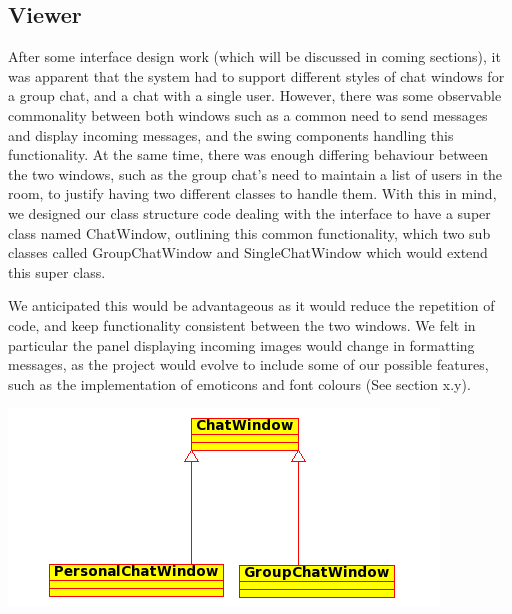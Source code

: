 \subsection {Viewer}

After some interface design work (which will be discussed in coming sections), it was apparent that the system had to support different styles of chat windows for a group chat, and a chat with a single user. However, there was some observable commonality between both windows such as a common need to send messages and display incoming messages, and the swing components handling this functionality. At the same time, there was enough differing behaviour between the two windows, such as the group chat’s need to maintain a list of users in the room, to justify having two different classes to handle them. With this in mind, we designed our class structure code dealing with the interface to have a super class named ChatWindow, outlining this common functionality, which two sub classes called GroupChatWindow and SingleChatWindow which would extend this super class. 

We anticipated this would be advantageous as it would reduce the repetition of code, and keep functionality consistent between the two windows. We felt in particular the panel displaying incoming images would change in formatting messages, as the project would evolve to include some of our possible features, such as the implementation of emoticons and font colours (See section x.y).  

\includegraphics[scale=0.65]{chapter2/diagrams/chatwin.png}








\subsubsection{}





